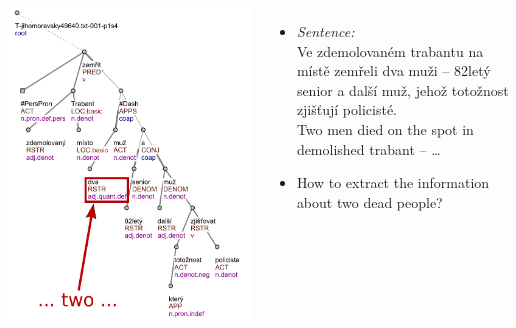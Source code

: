 \documentclass[xcolor=dvipsnames]{beamer}
\begin{document}
\begin{frame}[plain]
\begin{columns}
\centerline{\includegraphics[height=0.95\vsize]{img/Two_Tree}}
\begin{itemize}
	\item \emph{Sentence:}
\medskip
{\small
\\Ve zdemolovaném trabantu na místě \alert{zemřeli dva muži} -- 82letý senior a další muž, jehož totožnost zjišťují policisté.
\medskip
\\\alert{Two men died} on the spot in demolished trabant -- \dots }
\bigskip
	\item How to extract the information about \alert{two dead} people?
\end{itemize}
\vspace{2cm}
\end{columns}
\end{frame}
\end{document}
